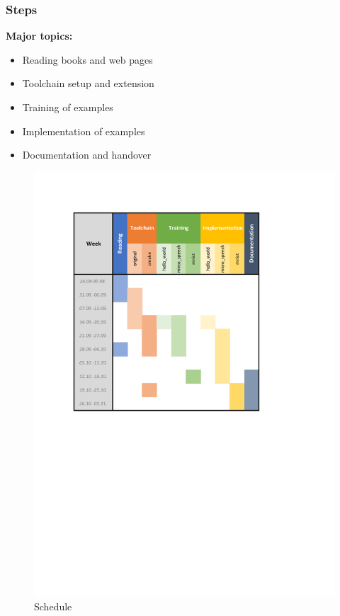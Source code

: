 \documentclass{tum-presentation}
\begin{document}
\begin{frame}
  \frametitle{Steps}
  \begin{multicols}{2}
\textbf{Major topics:}

\begin{itemize}
    \item Reading books and web pages
    \item Toolchain setup and extension
    \item Training of examples
    \item Implementation of examples
    \item Documentation and handover
\end{itemize}
  \begin{figure}[h]
\centering
\includegraphics[scale=0.6]{figures/fp_report_plan.pdf}
\caption{Schedule}
\label{fig:schedule}
\end{figure}
  \end{multicols}

\end{frame}
\end{document}

